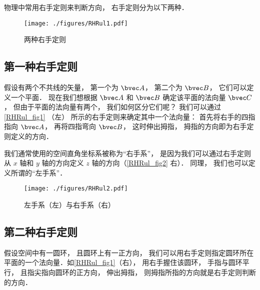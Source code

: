 
物理中常用右手定则来判断方向， 右手定则分为以下两种．

\begin{figure}[ht]
\centering
\texttt{[image: ./figures/RHRul1.pdf]}
\caption{两种右手定则} \label{RHRul_fig1}
\end{figure}

\subsection{第一种右手定则}
假设有两个不共线的矢量， 第一个为 $\bvec A$， 第二个为 $\bvec B$， 它们可以定义一个平面． 现在我们想根据 $\bvec A$ 和 $\bvec B$ 确定该平面的法向量 $\bvec C$， 但由于平面的法向量有两个， 我们如何区分它们呢？ 我们可以通过\autoref{RHRul_fig1} （左） 所示的右手定则来确定其中一个法向量： 首先将右手的四指指向 $\bvec A$， 再将四指弯向 $\bvec B$， 这时伸出拇指， 拇指的方向即为右手定则定义的方向．

我们通常使用的空间直角坐标系被称为“右手系”， 是因为我们可以通过右手定则从 $x$ 轴和 $y$ 轴的方向定义 $z$ 轴的方向（\autoref{RHRul_fig2} 右）． 同理， 我们也可以定义所谓的“左手系”．

\begin{figure}[ht]
\centering
\texttt{[image: ./figures/RHRul2.pdf]}
\caption{左手系（左）与右手系（右）} \label{RHRul_fig2}
\end{figure}

\subsection{第二种右手定则}
假设空间中有一圆环， 且圆环上有一正方向， 我们可以用右手定则指定圆环所在平面的一个法向量．如\autoref{RHRul_fig1}（右）， 用右手握住该圆环， 手指与圆环平行， 且指尖指向圆环的正方向， 伸出拇指， 则拇指所指的方向就是右手定则判断的方向．

